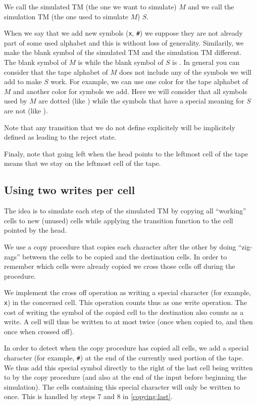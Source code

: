 \documentclass{article}
\newcommand{\0}{\texttt{\textvisiblespace}}
\newcommand{\°}{\obullet{\0}}
\newcommand{\X}{\texttt{x}}
\newcommand{\e}{\texttt{\#}}
\newcommand{\TM}{TM}
\begin{document}
We call the simulated \TM{} (the one we want to simulate) \(M\) and we
call the simulation \TM{} (the one used to simulate \(M\)) \(S\).

When we say that we add new symbols (\X{}, \e{}) we suppose they
are not already part of some used alphabet and this is without loss of
generality.
Similarily, we make the blank symbol of the simulated \TM{} and the
simulation \TM{} different. The blank symbol of \(M\)
is \°{} while the blank symbol of \(S\)
is \0{}. In general you can consider that the tape alphabet of \(M\)
does not include any of the symbols we will add to make \(S\) work.
For example, we can use one color for the tape alphabet of \(M\) and
another color for symbols we add. Here we will consider that all symbols used
by \(M\) are dotted (like \°{}) while the symbols that
have a special meaning for \(S\) are not (like \0{}).

Note that any transition that we do not define explicitely will be implicitely
defined as leading to the reject state.

Finaly, note that going left when the head points to the leftmost cell of the
tape means that we stay on the leftmost cell of the tape.

\subsection{Using two writes per cell}
The idea is to simulate each step of the simulated
\TM{} by copying all ``working'' cells to new (unused) cells
while applying the transition function to the cell pointed by the head.

We use a copy procedure that copies each character after
the other by doing ``zig-zags'' between the cells to be copied and the destination
cells. In order to remember which cells were already copied we cross those
cells off during the procedure.

We implement the cross off operation as
writing a special character (for example, \X{}) in the concerned cell.
This operation counts thus as one write operation. The cost of writing the
symbol of the copied cell to the destination also counts as a write. A cell
will thus be written to at most twice (once when copied to, and then
once when crossed off).

In order to detect when the copy procedure has copied all cells, we add a
special character (for example, \e)
at the end of the currently used portion of the tape.
We thus add this special symbol directly to the right of the last cell being written to by the
copy procedure (and also at the end of the input before beginning the
simulation). The cells containing this special character will only be written to once.
This is handled by steps 7 and 8 in \ref{copying:last}.
\end{document}

